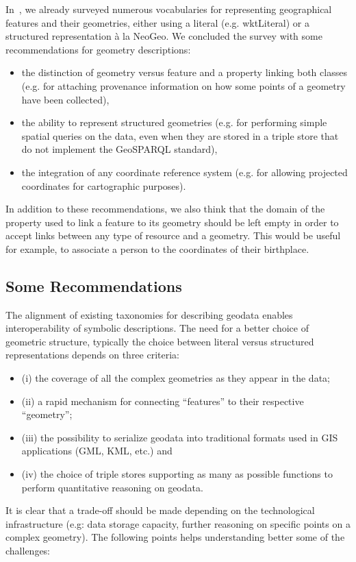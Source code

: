 In~\cite{Atemezing:TC12}, we already surveyed numerous vocabularies for representing geographical features and their geometries, either using a literal (e.g. wktLiteral) or a structured representation \`a la NeoGeo. We concluded the survey with some recommendations for geometry descriptions:
\begin{itemize}
 \item the distinction of geometry versus feature and a property linking both classes (e.g. for attaching provenance information on how some points of a geometry have been collected),
 \item the ability to represent structured geometries (e.g. for performing simple spatial queries on the data, even when they are stored in a triple store that do not implement the GeoSPARQL standard),
 \item the integration of any coordinate reference system  (e.g. for allowing projected coordinates for cartographic purposes).
\end{itemize}
In addition to these recommendations, we also think that the domain of the property used to link a feature to its geometry should be left empty in order to accept links between any type of resource and a geometry. This would be useful for example, to associate a person to the coordinates of their birthplace.

\subsection{Some Recommendations}
The alignment of existing taxonomies for describing geodata enables interoperability of symbolic descriptions. The need for a better choice of geometric structure, typically the choice between literal versus structured representations depends on three criteria: 
\begin{itemize}
\item (i) the coverage of all the complex geometries as they appear in the data;
\item (ii) a rapid mechanism for connecting ``features'' to their respective ``geometry'';
\item (iii) the possibility to serialize geodata into traditional formats used in GIS applications (GML, KML, etc.) and
\item (iv) the choice of triple stores supporting as many as possible functions to perform quantitative reasoning on geodata.
\end{itemize}
    
    It is clear that a trade-off should be made depending on the technological infrastructure (e.g: data storage capacity, further reasoning on specific points on a complex geometry). The following points helps understanding better some of the challenges: 

